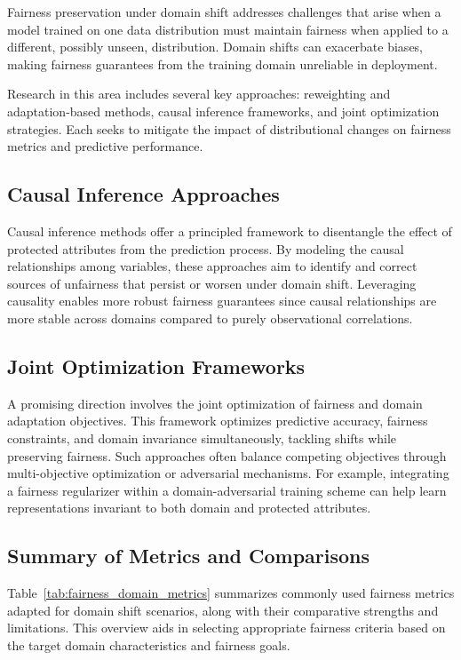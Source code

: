 \documentclass[sigconf]{acmart}
\begin{document}
Fairness preservation under domain shift addresses challenges that arise when a model trained on one data distribution must maintain fairness when applied to a different, possibly unseen, distribution. Domain shifts can exacerbate biases, making fairness guarantees from the training domain unreliable in deployment.

Research in this area includes several key approaches: reweighting and adaptation-based methods, causal inference frameworks, and joint optimization strategies. Each seeks to mitigate the impact of distributional changes on fairness metrics and predictive performance.

\subsection{Causal Inference Approaches}
Causal inference methods offer a principled framework to disentangle the effect of protected attributes from the prediction process. By modeling the causal relationships among variables, these approaches aim to identify and correct sources of unfairness that persist or worsen under domain shift. Leveraging causality enables more robust fairness guarantees since causal relationships are more stable across domains compared to purely observational correlations.

\subsection{Joint Optimization Frameworks}
A promising direction involves the joint optimization of fairness and domain adaptation objectives. This framework optimizes predictive accuracy, fairness constraints, and domain invariance simultaneously, tackling shifts while preserving fairness. Such approaches often balance competing objectives through multi-objective optimization or adversarial mechanisms. For example, integrating a fairness regularizer within a domain-adversarial training scheme can help learn representations invariant to both domain and protected attributes.

\subsection{Summary of Metrics and Comparisons}
Table~\ref{tab:fairness_domain_metrics} summarizes commonly used fairness metrics adapted for domain shift scenarios, along with their comparative strengths and limitations. This overview aids in selecting appropriate fairness criteria based on the target domain characteristics and fairness goals.
\end{document}
